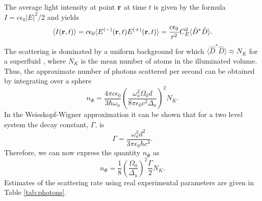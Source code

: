The average light intensity at point $\mathbf{r}$ at time $t$ is given
by the formula $I = c \epsilon_0 |E|^2/2$ and yields
\begin{equation}
  \langle I (\mathbf{r}, t) \rangle = c \epsilon_0 \langle
  E^{(-)} (\mathbf{r}, t) E^{(+)} (\mathbf{r}, t) \rangle =
  \frac{c \epsilon_0}{r^2} C_E^2 \langle \hat{D}^* \hat{D} \rangle.
\end{equation}
The scattering is dominated by a uniform background for which $\langle
\hat{D}^* \hat{D} \rangle \approx N_K$ for a superfluid
\cite{mekhov2012}, where $N_K$ is the mean number of atoms in the
illuminated volume. Thus, the approximate number of photons scattered
per second can be obtained by integrating over a sphere
\begin{equation}
  n_{\Phi} = \frac{4 \pi c \epsilon_0}{3 \hbar \omega_a} \left(\frac{\omega_a^2
      \Omega_0 d}{8 \pi \epsilon_0 c^2 \Delta_a}\right)^2 N_K.
\end{equation}
In the Weisskopf-Wigner approximation it can be shown \cite{Scully}
that for a two level system the decay constant, $\Gamma$, is
\begin{equation}
  \Gamma = \frac{\omega_a^3 d^2}{3 \pi \epsilon_0 \hbar c^3}.
\end{equation}
Therefore, we can now express the quantity $n_{\Phi}$ as
\begin{equation}
  n_{\Phi} = \frac{1}{8} \left(\frac{\Omega_0}{\Delta_a}\right)^2 \frac{\Gamma}{2} N_K.
\end{equation}
Estimates of the scattering rate using real experimental parameters
are given in Table \ref{tab:photons}.

